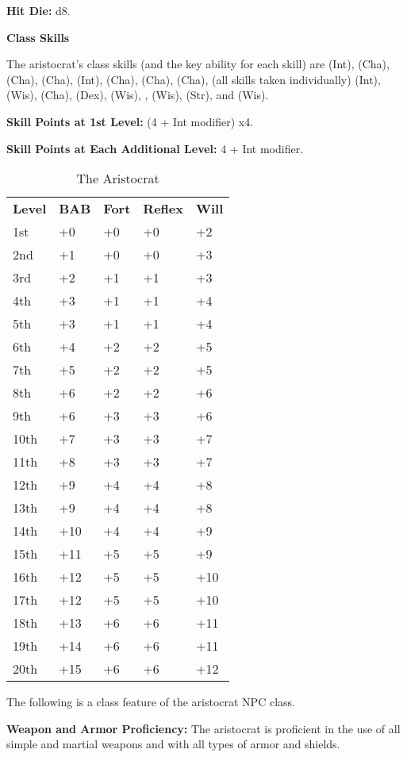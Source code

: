
\textbf{Hit Die:} d8.

\textbf{Class Skills}

The aristocrat's class skills (and the key ability for each skill) are  
(Int),  (Cha),  (Cha),  (Cha),  (Int),  
(Cha),  (Cha),  (Cha),  (all skills taken individually) 
(Int),  (Wis),  (Cha),  (Dex),  (Wis), , 
 (Wis),  (Str), and  (Wis). 

\textbf{Skill Points at 1st Level:} (4 + Int modifier) x4.

\textbf{Skill Points at Each Additional Level:} 4 + Int modifier.

\begin{table}[htb]
\caption{The Aristocrat}
\centering
\begin{tabular}{*{5}{l}}
\textbf{Level} & \textbf{BAB} & \textbf{Fort} & \textbf{Reflex} & \textbf{Will}\\
1st & +0 & +0 & +0 & +2 \\
2nd & +1 & +0 & +0 & +3 \\
3rd & +2 & +1 & +1 & +3 \\
4th & +3 & +1 & +1 & +4 \\
5th & +3 & +1 & +1 & +4 \\
6th & +4 & +2 & +2 & +5 \\
7th & +5 & +2 & +2 & +5 \\
8th & +6 & +2 & +2 & +6 \\
9th & +6 & +3 & +3 & +6 \\
10th & +7 & +3 & +3 & +7 \\
11th & +8 & +3 & +3 & +7 \\
12th & +9 & +4 & +4 & +8 \\
13th & +9 & +4 & +4 & +8 \\
14th & +10 & +4 & +4 & +9 \\
15th & +11 & +5 & +5 & +9 \\
16th & +12 & +5 & +5 & +10 \\
17th & +12 & +5 & +5 & +10 \\
18th & +13 & +6 & +6 & +11 \\
19th & +14 & +6 & +6 & +11 \\
20th & +15 & +6 & +6 & +12 \\
\end{tabular}
\end{table}

\ClassFeatures

The following is a class feature of the aristocrat NPC class.

\textbf{Weapon and Armor Proficiency:} The aristocrat is proficient in the use 
of all simple and martial weapons and with all types of armor and shields.
